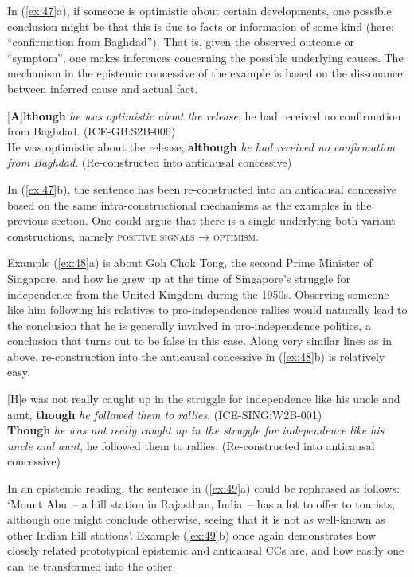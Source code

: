 In (\ref{ex:47}a), if someone is optimistic about certain developments, one possible conclusion might be that this is due to facts or information of some kind (here: “confirmation from Baghdad”). That is, given the observed outcome or “symptom”, one makes inferences concerning the possible underlying causes. The mechanism in the epistemic concessive of the example is based on the dissonance between inferred cause and actual fact.

\ea\label{ex:47}
    \ea\label{ex:47a}\label{bkm:Ref487278203}[\textbf{A}]\textbf{lthough} \textit{he was optimistic about the release}, he had received no confirmation from Baghdad. (ICE-GB:S2B-006)\\
    \ex\label{ex:47b}He was optimistic about the release, \textbf{although} \textit{he had received no confirmation from Baghdad}. (Re-constructed into anticausal concessive)\\
\z
\z

In (\ref{ex:47}b), the sentence has been re-constructed into an anticausal concessive based on the same intra-constructional mechanisms as the examples in the previous section. One could argue that there is a single  underlying both variant constructions, namely \textsc{positive} \textsc{signals} → \textsc{optimism}.

Example (\ref{ex:48}a) is about Goh Chok Tong, the second Prime Minister of Singapore, and how he grew up at the time of Singapore’s struggle for independence from the United Kingdom during the 1950s. Observing someone like him following his relatives to pro-independence rallies would naturally lead to the conclusion that he is generally involved in pro-independence politics, a conclusion that turns out to be false in this case. Along very similar lines as in  above, re-construction into the anticausal concessive in (\ref{ex:48}b) is relatively easy.

\ea\label{ex:48}
    \ea\label{ex:48a}\label{bkm:Ref487463711}[H]e was not really caught up in the struggle for independence like his uncle and aunt, \textbf{though} \textit{he followed them to rallies}. (ICE-SING:W2B-001)\\
    \ex\label{ex:48b}\textbf{Though} \textit{he was not really caught up in the struggle for independence like his uncle and aunt}, he followed them to rallies. (Re-constructed into anticausal concessive)\\
\z
\z

In an epistemic reading, the sentence in (\ref{ex:49}a) could be rephrased as follows: ‘Mount Abu~– a hill station in Rajasthan, India~– has a lot to offer to tourists, although one might conclude otherwise, seeing that it is not as well-known as other Indian hill stations’. Example (\ref{ex:49}b) once again demonstrates how closely related prototypical epistemic and anticausal CCs are, and how easily one can be transformed into the other.

